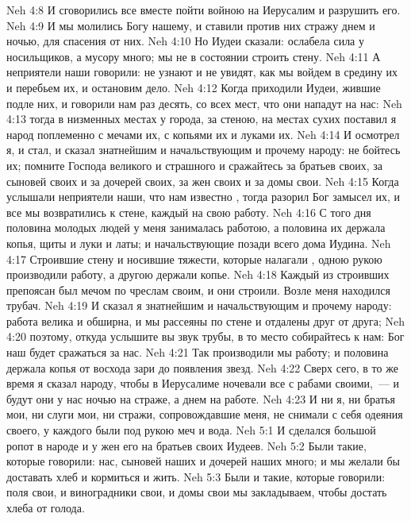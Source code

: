 \vs Neh 4:8 И сговорились все вместе пойти войною на Иерусалим и разрушить его.
\vs Neh 4:9 И мы молились Богу нашему, и ставили против них стражу днем и ночью, для спасения от них.
\vs Neh 4:10 Но Иудеи сказали: ослабела сила у носильщиков, а мусору много; мы не в состоянии строить стену.
\vs Neh 4:11 А неприятели наши говорили: не узнают и не увидят, как  мы войдем в средину их и перебьем их, и остановим дело.
\vs Neh 4:12 Когда приходили Иудеи, жившие подле них, и говорили нам раз десять, со всех мест, что они нападут на нас:
\vs Neh 4:13 тогда в низменных местах у города, за стеною, на местах сухих поставил я народ поплеменно с мечами их, с копьями их и луками их.
\vs Neh 4:14 И осмотрел я, и стал, и сказал знатнейшим и начальствующим и прочему народу: не бойтесь их; помните Господа великого и страшного и сражайтесь за братьев своих, за сыновей своих и за дочерей своих, за жен своих и за домы свои.
\rsbpar\vs Neh 4:15 Когда услышали неприятели наши, что нам известно , тогда разорил Бог замысел их, и все мы возвратились к стене, каждый на свою работу.
\vs Neh 4:16 С того дня половина молодых людей у меня занималась работою, а  половина их держала копья, щиты и луки и латы; и начальствующие  позади всего дома Иудина.
\vs Neh 4:17 Строившие стену и носившие тяжести, которые налагали , одною рукою производили работу, а другою держали копье.
\vs Neh 4:18 Каждый из строивших препоясан был мечом по чреслам своим, и  они строили. Возле меня находился трубач.
\vs Neh 4:19 И сказал я знатнейшим и начальствующим и прочему народу: работа велика и обширна, и мы рассеяны по стене и отдалены друг от друга;
\vs Neh 4:20 поэтому, откуда услышите вы звук трубы, в то место собирайтесь к нам: Бог наш будет сражаться за нас.
\vs Neh 4:21 Так производили мы работу; и половина держала копья от восхода зари до появления звезд.
\vs Neh 4:22 Сверх сего, в то же время я сказал народу, чтобы в Иерусалиме ночевали все с рабами своими,~--- и будут они у нас ночью на страже, а днем на работе.
\vs Neh 4:23 И ни я, ни братья мои, ни слуги мои, ни стражи, сопровождавшие меня, не снимали с себя одеяния своего, у каждого были под рукою меч и вода.
\vs Neh 5:1 И сделался большой ропот в народе и у жен его на братьев своих Иудеев.
\vs Neh 5:2 Были такие, которые говорили: нас, сыновей наших и дочерей наших много; и мы желали бы доставать хлеб и кормиться и жить.
\vs Neh 5:3 Были и такие, которые говорили: поля свои, и виноградники свои, и домы свои мы закладываем, чтобы достать хлеба от голода.
